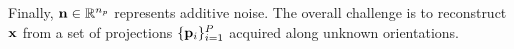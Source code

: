 Finally, $\mathbf{n} \in \mathbb{R}^{n_p}$ represents additive noise.
The overall challenge is to reconstruct $\mathbf{x}$ from a set of projections $\{\mathbf{p}_i\}_{i=1}^P$ acquired along unknown orientations.


